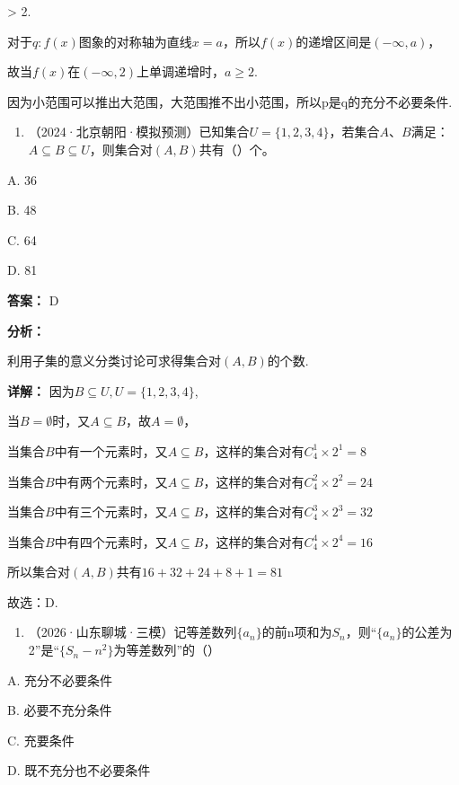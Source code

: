 \documentclass[11pt,a4paper]{ctexart}
\begin{document}
\textgreater{} 2.

对于\(q: f(x)\)图象的对称轴为直线\(x = a\)，所以\(f(x)\)的递增区间是\((- \infty, a)\)，

故当\(f(x)\)在\((-∞,2)\)上单调递增时，\(a≥2\).

因为小范围可以推出大范围，大范围推不出小范围，所以p是q的充分不必要条件.

\begin{enumerate}[label=\arabic*., leftmargin=*, start=14]
\item （2024·北京朝阳·模拟预测）已知集合\(U = \{1,2,3,4\}\)，若集合\(A\)、\(B\)满足：\(A \subseteq B \subseteq U\)，则集合对\((A,B)\)共有（）个。
\end{enumerate}

A. 36

B. 48

C. 64

D. 81

\textbf{答案：}
D

\textbf{分析：}

利用子集的意义分类讨论可求得集合对\((A,B)\)的个数.

\textbf{详解：}
因为\(B \subseteq U, U = \{1,2,3,4\}\),

当\(B = \emptyset\)时，又\(A \subseteq B\)，故\(A = \emptyset\)，

当集合\(B\)中有一个元素时，又\(A \subseteq B\)，这样的集合对有\(C_4^1 \times 2^1 = 8\)

当集合\(B\)中有两个元素时，又\(A \subseteq B\)，这样的集合对有\(C_4^2 \times 2^2 = 24\)

当集合\(B\)中有三个元素时，又\(A \subseteq B\)，这样的集合对有\(C_4^3 \times 2^3 = 32\)

当集合\(B\)中有四个元素时，又\(A \subseteq B\)，这样的集合对有\(C_4^4 \times 2^4 = 16\)

所以集合对\((A,B)\)共有\(16 + 32 + 24 + 8 + 1 = 81\)

故选：D.

\begin{enumerate}[label=\arabic*., leftmargin=*, start=15]
\item （2026·山东聊城·三模）记等差数列\(\{a_{n}\}\)的前n项和为\(S_{n}\)，则``\(\{a_{n}\}\)的公差为2''是``\(\{S_{n}-n^{2}\}\)为等差数列''的（）
\end{enumerate}

A. 充分不必要条件

B. 必要不充分条件

C. 充要条件

D. 既不充分也不必要条件
\end{document}
